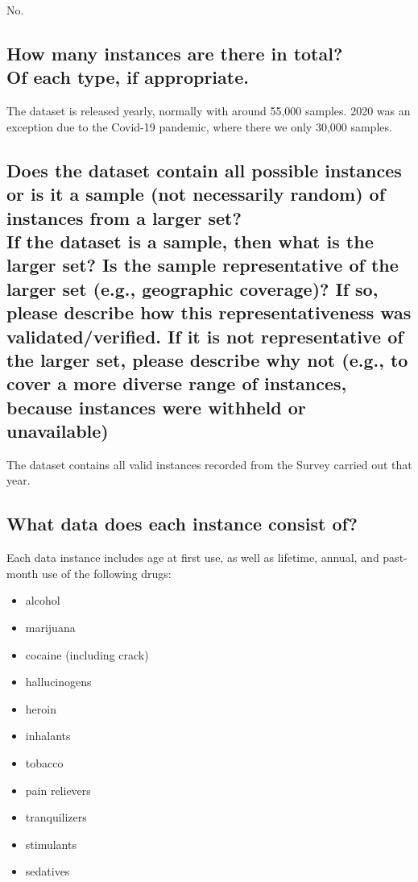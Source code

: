 \documentclass[letterpaper, 10 pt, conference]{ieeeconf}  %
\newcommand{\subtitle}[1]{{\\ \small \normalfont \color{purple} #1}}
\begin{document}
No.

\subsection{How many instances are there in total? \subtitle{Of each type, if appropriate.}}

The dataset is released yearly, normally with around 55,000 samples. 2020 was an exception due to the Covid-19 pandemic, where there we only 30,000 samples.

\subsection{Does the dataset contain all possible instances or is it a sample (not necessarily random) of instances from a larger set? \subtitle{If the dataset is a sample, then what is the larger set? Is the sample representative of the larger set (e.g., geographic coverage)? If so, please describe how this representativeness was validated/verified. If it is not representative of the larger set, please describe why not (e.g., to cover a more diverse range of instances, because instances were withheld or unavailable)}}

The dataset contains all valid instances recorded from the Survey carried out that year.

\subsection{What data does each instance consist of?}

Each data instance includes age at first use, as well as lifetime, annual, and past-month use of the following drugs:

\begin{itemize}
    \item alcohol
    \item marijuana
    \item cocaine (including crack)
    \item hallucinogens
    \item heroin 
    \item inhalants 
    \item tobacco
    \item pain relievers
    \item tranquilizers
    \item stimulants
    \item sedatives
\end{itemize}
\end{document}
